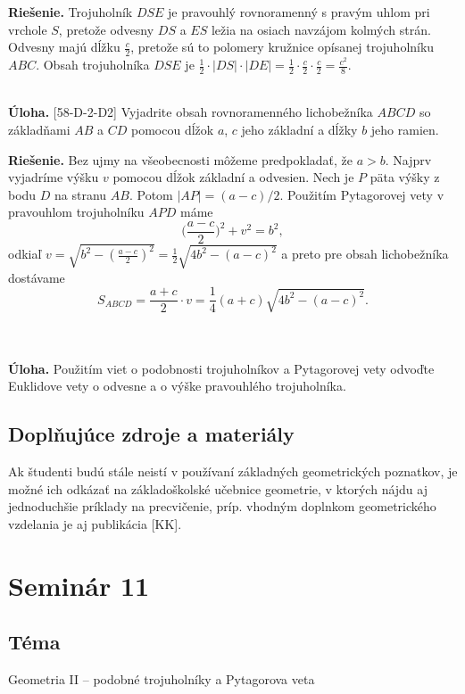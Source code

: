 \documentclass[11pt,a4paper,oneside,final]{book}
\newcommand{\ul}{\textbf{Úloha.} }
\newcommand{\rie}{\textbf{Riešenie.} }
\begin{document}
\rie Trojuholník $DSE$ je pravouhlý rovnoramenný s pravým uhlom pri vrchole $S$, pretože odvesny $DS$ a $ES$ ležia na osiach navzájom kolmých strán. Odvesny majú dĺžku $\frac{c}{2}$, pretože sú to polomery kružnice opísanej trojuholníku $ABC$. Obsah trojuholníka $DSE$ je $\frac{1}{2}\cdot|DS|\cdot |DE|=\frac{1}{2}\cdot \frac{c}{2}\cdot\frac{c}{2}=\frac{c^2}{8}.$ \\
\\
\begin{tcolorbox}[breakable,notitle,boxrule=0pt,colback=light-gray,colframe=light-gray]\ul [58-D-2-D2] Vyjadrite obsah rovnoramenného lichobežníka $ABCD$ so základňami $AB$ a $CD$ pomocou dĺžok $a$, $c$ jeho základní a dĺžky $b$ jeho ramien.

\end{tcolorbox}

\rie Bez ujmy na všeobecnosti môžeme predpokladať, že $a>b$. Najprv vyjadríme výšku $v$ pomocou dĺžok základní a odvesien. Nech je $P$ päta výšky z bodu $D$ na stranu $AB$. Potom $|AP|=(a-c)/2$. Použitím Pytagorovej vety v pravouhlom trojuholníku $APD$ máme
$$\bigg(\frac{a-c}{2}\bigg)^2+v^2=b^2,$$
odkiaľ $v=\sqrt{b^2-(\frac{a-c}{2})^2}=\frac{1}{2}\sqrt{4b^2-(a-c)^2}$ a preto pre obsah lichobežníka dostávame $$S_{ABCD}=\frac{a+c}{2}\cdot v=\frac{1}{4}(a+c)\sqrt{4b^2-(a-c)^2}.$$\\
\\
\begin{tcolorbox}[breakable,notitle,boxrule=0pt,colback=light-gray,colframe=light-gray]\ul Použitím viet o podobnosti trojuholníkov a Pytagorovej vety odvoďte Euklidove vety o odvesne a o výške pravouhlého trojuholníka.
\end{tcolorbox}

\subsection*{Doplňujúce zdroje a materiály}
Ak študenti budú stále neistí v používaní základných geometrických poznatkov, je možné ich odkázať na základoškolské učebnice geometrie, v ktorých nájdu aj jednoduchšie príklady na precvičenie, príp. vhodným doplnkom geometrického vzdelania je aj publikácia [KK].
\newpage
\section*{Seminár 11}
\subsection*{Téma}
Geometria II -- podobné trojuholníky a Pytagorova veta
\end{document}
